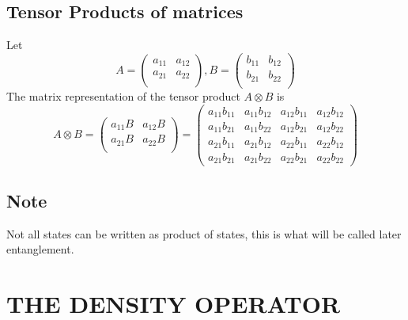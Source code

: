 \documentclass[12pt,oneside]{book}
\begin{document}
\section{Tensor Products of matrices}
Let
\[ A =  \left( \begin{matrix}
            a_{11} & a_{12} \\
            a_{21} & a_{22} \\
        \end{matrix}\right) , B = \left( \begin{matrix}
            b_{11} & b_{12} \\
            b_{21} & b_{22} \\
        \end{matrix}\right)\]
The matrix representation of the tensor product $A\otimes B$ is
\[ A\otimes B =  \left( \begin{matrix}
            a_{11}B & a_{12}B \\
            a_{21}B & a_{22}B \\
        \end{matrix}\right) =  \left( \begin{matrix}
            a_{11}b_{11} & a_{11}b_{12} & a_{12}b_{11} & a_{12}b_{12} \\
            a_{11}b_{21} & a_{11}b_{22} & a_{12}b_{21} & a_{12}b_{22} \\
            a_{21}b_{11} & a_{21}b_{12} & a_{22}b_{11} & a_{22}b_{12} \\
            a_{21}b_{21} & a_{21}b_{22} & a_{22}b_{21} & a_{22}b_{22}
        \end{matrix}\right)  \]
\section{Note}
Not all states can be written as product of states, this is what will be called later entanglement.

\chapter{THE DENSITY OPERATOR}
\end{document}
